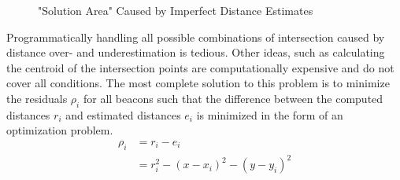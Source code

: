 \documentclass[a4paper, oneside]{ipsreport}
\begin{document}
\begin{figure}[h]
	\def\firstcircle{(0,0) circle (2.5cm)}
	\def\secondcircle{(3,-1) circle (2.2cm)}
	\def\thirdcircle{(3, 1.5) circle (2.75cm)}

	\centering
	\caption{"Solution Area" Caused by Imperfect Distance Estimates}
	\label{fig:trilaterationarea}
\end{figure}
Programmatically handling all possible combinations of intersection caused by distance over- and underestimation is tedious. Other ideas, such as calculating the centroid of the intersection points are computationally expensive and do not cover all conditions. The most complete solution to this problem is to minimize the residuals $\rho_i$ for all beacons such that the difference between the computed distances $r_i$ and estimated distances $e_i$ is minimized \cite{localizationMIT} in the form of an optimization problem.
\begin{equation}
	\label{eq:residual}
	\begin{split}
		\rho_i & =  r_i - e_i \\
			& = r_i^2 - (x - x_i)^2 - (y - y_i)^2
	\end{split}
\end{equation}
\end{document}

